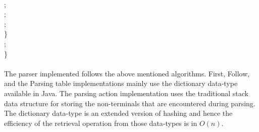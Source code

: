 \documentclass[12pt]{article}
\begin{document}
\indent{}\\
\indent\indent{};\\
\indent\indent{}; \\
\indent\indent{};\\
\indent\indent \} \\
\indent{};\\
\indent \} \\
\\
The parser implemented follows the above mentioned algorithms. First, Follow, and the Parsing table implementations mainly use the dictionary data-type available in Java. The parsing action implementation uses the traditional stack data structure for storing the non-terminals that are encountered during parsing. The dictionary data-type is an extended version of hashing and hence the efficiency of the retrieval operation from those data-types is in $O(n)$. 
\end{document}
